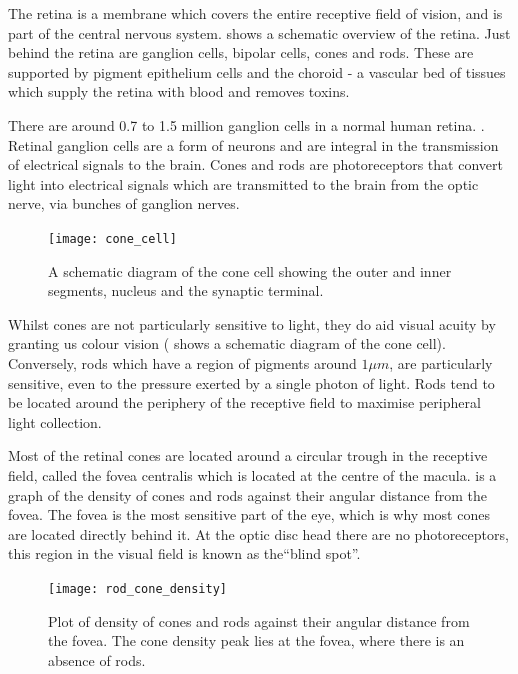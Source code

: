 The retina is a membrane which covers the entire receptive field of
vision, and is part of the central nervous system.\cite{rogers1983neurite}
 shows a schematic overview of the retina. Just behind the
retina are ganglion cells, bipolar cells, cones and rods. These are supported
by pigment epithelium cells and the choroid - a vascular bed of tissues which
supply the retina with blood and removes toxins. \cite{lutty1996localization} 

There are around 0.7 to 1.5 million ganglion cells in a normal human retina.
\cite{curcio1990topography}. Retinal ganglion cells are a form of neurons
and are integral in the transmission of electrical signals to the brain.
\cite{meyer1995characterization} Cones and rods are photoreceptors
that convert light into electrical signals which are transmitted to the
brain from the optic nerve, via bunches of ganglion nerves.

\begin{figure}[H]
\centering
  \texttt{[image: cone\_cell]}
\caption{A schematic diagram of the cone cell showing the outer and inner
segments, nucleus and the synaptic terminal.\cite{wikicone}}
\label{fig:cone}
\end{figure}

Whilst cones are not particularly sensitive to light, they do aid visual
acuity by granting us colour vision ( shows a schematic
diagram of the cone cell).\cite{bowmaker1980visual} Conversely, rods
which have a region of pigments around $1\mu{m}$, are particularly
sensitive, even to the pressure exerted by a single photon of light.
Rods tend to be located around the periphery of the receptive field to
maximise peripheral light collection.
\cite{liebman1964sensitive,baylor1979responses}

Most of the retinal cones are located around a circular trough in the
receptive field, called the fovea centralis which is located at the centre
of the macula.\cite{hendrickson1994primate}
 is a graph of the density of cones and rods
against their angular distance from the fovea. The fovea is the most
sensitive part of the eye, which is why most cones are located directly
behind it. At the optic disc head there are no photoreceptors, this region
in the visual field is known as the\enquote{blind spot}.

\begin{figure}[H]
\centering
  \texttt{[image: rod\_cone\_density]}
\caption{Plot of density of cones and rods against their angular distance from
the fovea. The cone density peak lies at the fovea, where there is an absence
of rods.}
\label{fig:rod_cone_density}
\end{figure}

